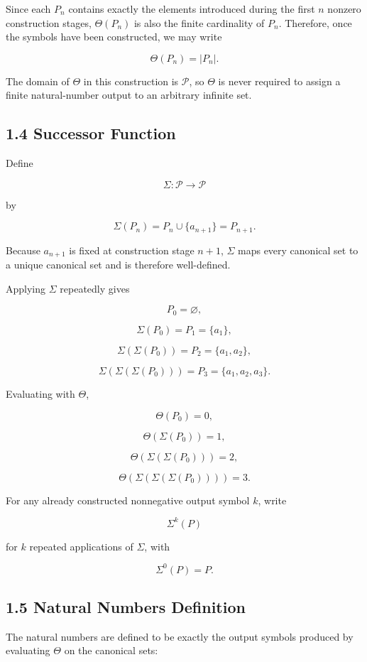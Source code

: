 \documentclass[12pt]{article}
\begin{document}
Since each \(P_n\) contains exactly the elements introduced during the first \(n\) nonzero construction stages, \(\Theta(P_n)\) is also the finite cardinality of \(P_n\). Therefore, once the symbols have been constructed, we may write

\[
\Theta(P_n)=|P_n|.
\]

The domain of \(\Theta\) in this construction is \(\mathcal P\), so \(\Theta\) is never required to assign a finite natural-number output to an arbitrary infinite set.

\subsection*{1.4 Successor Function}

Define

\[
\Sigma:\mathcal P\to\mathcal P
\]

by

\[
\Sigma(P_n)=P_n\cup\{a_{n+1}\}=P_{n+1}.
\]

Because \(a_{n+1}\) is fixed at construction stage \(n+1\), \(\Sigma\) maps every canonical set to a unique canonical set and is therefore well-defined.

Applying \(\Sigma\) repeatedly gives

\[
P_0=\varnothing,
\]

\[
\Sigma(P_0)=P_1=\{a_1\},
\]

\[
\Sigma(\Sigma(P_0))=P_2=\{a_1,a_2\},
\]

\[
\Sigma(\Sigma(\Sigma(P_0)))=P_3=\{a_1,a_2,a_3\}.
\]

Evaluating with \(\Theta\),

\[
\Theta(P_0)=0,
\]

\[
\Theta(\Sigma(P_0))=1,
\]

\[
\Theta(\Sigma(\Sigma(P_0)))=2,
\]

\[
\Theta(\Sigma(\Sigma(\Sigma(P_0))))=3.
\]

For any already constructed nonnegative output symbol \(k\), write

\[
\Sigma^k(P)
\]

for \(k\) repeated applications of \(\Sigma\), with

\[
\Sigma^0(P)=P.
\]

\subsection*{1.5 Natural Numbers Definition}

The natural numbers are defined to be exactly the output symbols produced by evaluating \(\Theta\) on the canonical sets:
\end{document}

